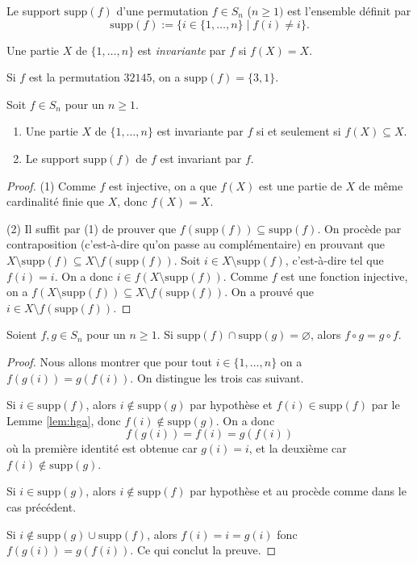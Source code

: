 \documentclass[french,course,oneside,theoremnosection]{lecture}
\newcommand{\supp}{\mathrm{supp}}
\begin{document}
\begin{definition}
Le support $\supp(f)$ d'une permutation $f\in S_n$ ($n \geq 1)$ est l'ensemble définit par 
\[
\supp(f):=\{i \in \{1, \ldots, n\} \mid f(i) \neq i\}.
\]

Une partie $X$ de $\{1, \ldots, n\}$ est \emph{invariante} par $f$ si $f(X)=X$.
\end{definition}
\begin{example}
Si $f$ est la permutation $32145$, on a $\supp(f)=\{3,1\}$.
\end{example}
\begin{lemma}\label{lem:hga}
Soit $f\in S_n$ pour un $n\geq 1$.
\begin{enumerate}[(1)]
\item Une partie $X$ de $\{1, \ldots, n\}$ est invariante par $f$ si et seulement si $f(X) \subseteq X$.
\item Le support $\supp(f)$ de $f$ est invariant par $f$.
\end{enumerate}
\end{lemma}
\begin{proof}
(1) Comme $f$ est injective, on a que $f(X)$ est une partie de $X$ de même cardinalité finie que $X$, donc $f(X)=X$.

(2) Il suffit par (1) de prouver que $f(\supp(f)) \subseteq \supp(f)$. On procède par contraposition (c'est-à-dire qu'on passe au complémentaire) en prouvant que $X\setminus \supp(f) \subseteq X\setminus f(\supp(f))$. Soit $i \in X\setminus \supp(f)$, c'est-à-dire tel que $f(i)=i$. On a donc $i \in f(X\setminus \supp(f))$. Comme $f$ est une fonction injective, on a $ f(X\setminus \supp(f)) \subseteq X\setminus f(\supp(f))$. On a prouvé que $i \in X\setminus f(\supp(f))$.
\end{proof}
\begin{proposition}
Soient $f, g \in S_n$ pour un $n \geq 1$. Si $\supp(f) \cap \supp(g)=\varnothing$, alors $f\circ g = g \circ f$. 
\end{proposition}
\begin{proof}
Nous allons montrer que pour tout $i \in \{1, \ldots, n\}$ on a $f(g(i))=g(f(i))$. 
On distingue les trois cas suivant.

Si $i\in \supp(f)$, alors $i \not \in \supp(g)$ par hypothèse et $f(i)\in \supp(f)$ par le Lemme \ref{lem:hga}, donc $f(i) \not\in \supp(g)$. On a donc
\[
f(g(i))=f(i)=g(f(i))
\] 
où la première identité est obtenue car $g(i)=i$, et la deuxième car $f(i)\not\in \supp(g)$.

Si $i \in \supp(g)$, alors $i\not\in \supp(f)$ par hypothèse et au procède comme dans le cas précédent.

Si $i \not\in \supp(g) \cup \supp(f)$, alors $f(i)=i=g(i)$ fonc $f(g(i))=g(f(i))$. Ce qui conclut la preuve.
\end{proof}
\end{document}
